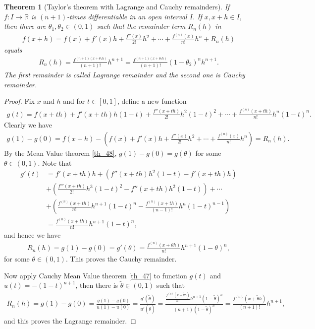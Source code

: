 \documentclass[10pt]{book}
\newtheorem{theorem}{Theorem}[chapter]
\theoremstyle{definition}
\numberwithin{equation}{chapter}
\begin{document}
\begin{theorem}[Taylor's theorem with Lagrange and Cauchy remainders]\label{th_628}
If $f: I \to \mathbb{R}$ is $(n+1)$-times differentiable in an open interval $I$. If $x, x + h \in I$, then there are $\theta_1, \theta_2 \in (0,1)$ such that the remainder term $R_n(h)$ in
\begin{align*}
    f(x + h) = f(x) + f'(x)h + \frac{f''(x)}{2!}h^2 + \cdots + \frac{f^{(n)}(x)}{n!}h^n + R_n(h)
\end{align*}
equals
\begin{align*}
    R_n(h) = \frac{f^{(n+1)(x+\theta_1 h)}}{(n+1)!} h^{n+1} = \frac{f^{(n+1)(x+\theta_2 h)}}{(n+1)!} (1-\theta_2)^n h^{n+1}.
\end{align*}
The first remainder is called Lagrange remainder and the second one is Cauchy remainder.
\end{theorem}
\begin{proof}
Fix $x$ and $h$ and for $t \in [0,1]$, define a new function
\begin{align*}
    g(t) = f(x+th) + f'(x+th)h(1-t) + \frac{f''(x+th)}{2!} h^2 (1-t)^2 + \cdots + \frac{f^{(n)}(x+th)}{n!} h^n (1-t)^n.
\end{align*}
Clearly we have 
\begin{align*}
    g(1) - g(0) = f(x+h) - \left(f(x) + f'(x)h + \frac{f''(x)}{2!}h^2 + \cdots + \frac{f^{(n)}(x)}{n!}h^n\right) = R_n(h).
\end{align*}
By the Mean Value theorem \ref{th_48}, $g(1) - g(0) = g(\theta)$ for some $\theta \in (0,1)$. Note that
\begin{align*}
    g'(t) & = f'(x+th)h + \left(f''(x+th)h^2(1-t) - f'(x+th)h\right) \\
    & + \left(\frac{f'''(x+th)}{2!} h^3 (1-t)^2 - f''(x+th)h^2(1-t)\right) + \cdots \\
    & + \left(\frac{f^{(n)}(x+th)}{n!} h^{n+1} (1-t)^n - \frac{f^{(n)}(x+th)}{(n-1)!} h^n (1-t)^{n-1}\right) \\
    & = \frac{f^{(n)}(x+th)}{n!} h^{n+1} (1-t)^n,
\end{align*}
and hence we have
\begin{align*}
    R_n(h) = g(1) - g(0) = g'(\theta) = \frac{f^{(n)}(x+\theta h)}{n!} h^{n+1} (1-\theta)^n,
\end{align*}
for some $\theta \in (0,1)$. This proves the Cauchy remainder.

Now apply Cauchy Mean Value theorem \ref{th_47} to function $g(t)$ and $u(t) = -(1 - t)^{n+1}$, then there is $\widetilde{\theta} \in (0,1)$ such that
\begin{align*}
    R_n(h) = g(1) - g(0) = \frac{g(1) - g(0)}{u(1) - u(0)} = \frac{g'(\widetilde{\theta})}{u'(\widetilde{\theta})} = \frac{\frac{f^{(n)}(x+\widetilde{\theta} h)}{n!} h^{n+1} (1-\widetilde{\theta})^n}{(n+1)(1 - \widetilde{\theta})^n} = \frac{f^{(n)}(x+\widetilde{\theta} h)}{(n+1)!} h^{n+1},
\end{align*}
and this proves the Lagrange remainder.
\end{proof}
\end{document}
